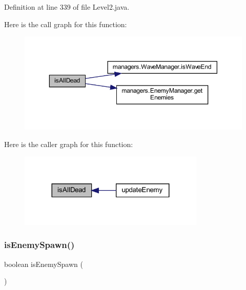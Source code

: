 Definition at line 339 of file Level2.\+java.

Here is the call graph for this function\+:\nopagebreak
\begin{figure}[H]
\begin{center}
\leavevmode
\includegraphics[width=350pt]{classscenes_1_1_level2_acd1846d50c3d8678777f9ab6716f5cf3_cgraph}
\end{center}
\end{figure}
Here is the caller graph for this function\+:\nopagebreak
\begin{figure}[H]
\begin{center}
\leavevmode
\includegraphics[width=251pt]{classscenes_1_1_level2_acd1846d50c3d8678777f9ab6716f5cf3_icgraph}
\end{center}
\end{figure}
\mbox{\label{classscenes_1_1_level2_a121827ebd1c5b24c92f966721b51c0b9}} 
\subsubsection{\texorpdfstring{is\+Enemy\+Spawn()}{isEnemySpawn()}}
{\footnotesize\ttfamily boolean is\+Enemy\+Spawn (\begin{DoxyParamCaption}{ }\end{DoxyParamCaption})\hspace{0.3cm}{\ttfamily [private]}}



